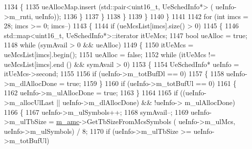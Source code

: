 \begin{DoxyCode}
1134                                         \{
1135                                                 ueAllocMap.insert (std::pair<uint16\_t, UeSchedInfo*> (
      ueInfo->m\_rnti, ueInfo));
1136                                         \}
1137                                 \}
1138                         \}
1139                 \}
1140         \}
1141 
1142         \textcolor{keywordflow}{for} (\textcolor{keywordtype}{int} imcs = 28; imcs >= 0; imcs--)
1143         \{
1144                 \textcolor{keywordflow}{if} (ueMcsList[imcs].size() > 0)
1145                 \{
1146                         std::map<uint16\_t, UeSchedInfo*>::iterator itUeMcs;
1147                         \textcolor{keywordtype}{bool} ueAlloc = \textcolor{keyword}{true};
1148                         \textcolor{keywordflow}{while} (symAvail > 0 && ueAlloc)
1149                         \{
1150                                 itUeMcs = ueMcsList[imcs].begin();
1151                                 ueAlloc = \textcolor{keyword}{false};
1152                                 \textcolor{keywordflow}{while} (itUeMcs != ueMcsList[imcs].end () && symAvail > 0)
1153                                 \{
1154                                         UeSchedInfo* ueInfo = itUeMcs->second;
1155 
1156                                         \textcolor{keywordflow}{if} (ueInfo->m\_totBufDl == 0)
1157                                         \{
1158                                                 ueInfo->m\_dlAllocDone = \textcolor{keyword}{true};
1159                                         \}
1160                                         \textcolor{keywordflow}{if} (ueInfo->m\_totBufUl == 0)
1161                                         \{
1162                                                 ueInfo->m\_ulAllocDone = \textcolor{keyword}{true};
1163                                         \}
1164 
1165                                         \textcolor{keywordflow}{if} ((ueInfo->m\_allocUlLast || ueInfo->m\_dlAllocDone) && !ueInfo->
      m\_ulAllocDone)
1166                                         \{
1167                                                 ueInfo->m\_ulSymbols++;
1168                                                 symAvail--;
1169                                                 ueInfo->m\_ulTbSize = \hyperlink{classns3_1_1MmWaveFlexTtiMaxRateMacScheduler_a8a84d69426586fddd45abe7174da607d}{m\_amc}->GetTbSizeFromMcsSymbols (
      ueInfo->m\_ulMcs, ueInfo->m\_ulSymbols) / 8;
1170                                                 \textcolor{keywordflow}{if} (ueInfo->m\_ulTbSize >= ueInfo->m\_totBufUl)

\end{DoxyCode}
